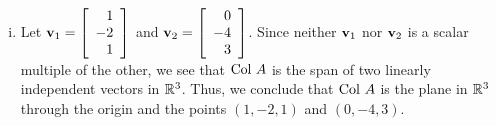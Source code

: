\begin{example}
\begin{enumerate}[i.]
	\item Let $\mathbf{v}_1 =  \left[ \begin {array}{r} 1\\ -2 \\ 1\end {array} \right]$ and $\mathbf{v}_2 =  \left[ \begin {array}{r} 0\\ -4 \\ 3\end {array} \right]$. Since neither $\mathbf{v}_1$ nor $\mathbf{v}_2$ is a scalar multiple of the other, we see that $\text{Col } A$ is the span of two linearly independent vectors in $\mathbb{R}^3$. Thus, we conclude that $\text{Col } A$ is the plane in $\mathbb{R}^3$ through the origin and the points $(1,-2,1)$ and $(0,-4,3)$. 
	
	\end{enumerate}
	

\end{example}

